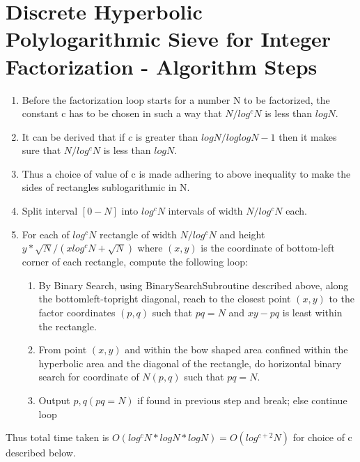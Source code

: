 \documentclass[11pt,onecolumn]{article}
\begin{document}
\section{Discrete Hyperbolic Polylogarithmic Sieve for Integer Factorization - Algorithm Steps}
\begin{enumerate}
\item Before the factorization loop starts for a number N to be factorized, the constant c has to be chosen in such a way that $N/log^{c}N$ is less than $logN$. 
\item It can be derived that if $c$ is greater than $logN/loglogN - 1$ then it makes sure that $N/log^{c}N$ is less than $logN$. 
\item Thus a choice of value of c is made adhering to above inequality to make the sides of rectangles sublogarithmic in N.
\item Split interval $[0-N]$ into $log^{c}N$ intervals of width $N/log^{c}N$ each.
\item For each of $log^{c}N$ rectangle of width $N/log^{c}N$ and height $y*\sqrt{N}/(xlog^{c}N + \sqrt{N})$ where $(x,y)$ is the coordinate of bottom-left corner of each rectangle, compute the following loop:
\begin{enumerate}
\item By Binary Search, using BinarySearchSubroutine described above, along the bottomleft-topright diagonal, reach to the closest point $(x,y)$ to the factor coordinates $(p,q)$ such that $pq=N$ and $xy-pq$ is least within the rectangle.
\item From point $(x,y)$ and within the bow shaped area confined within the hyperbolic area and the diagonal of the rectangle, do horizontal binary search for coordinate of $N(p,q)$ such that $pq=N$.
\item Output $p,q (pq=N)$ if found in previous step and break; else continue loop
\end{enumerate}
\end{enumerate}
Thus total time taken is $O(log^{c}N * logN * logN) = O(log^{c+2}N)$ for choice of c described below. 
\end{document}
